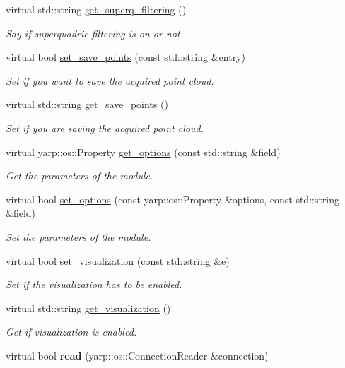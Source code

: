 \begin{DoxyCompactItemize}
virtual std\-::string \hyperlink{classsuperquadricModel__IDL_af99d29d42b96b8db6c90c5fd48cfb253}{get\-\_\-superq\-\_\-filtering} ()
\begin{DoxyCompactList}\small\item\em Say if superquadric filtering is on or not. \end{DoxyCompactList}\item 
virtual bool \hyperlink{classsuperquadricModel__IDL_a8368b783845a3e5ae7e0706ee5b888c0}{set\-\_\-save\-\_\-points} (const std\-::string \&entry)
\begin{DoxyCompactList}\small\item\em Set if you want to save the acquired point cloud. \end{DoxyCompactList}\item 
virtual std\-::string \hyperlink{classsuperquadricModel__IDL_a4b101fe118a1ee912468562bde0b0df4}{get\-\_\-save\-\_\-points} ()
\begin{DoxyCompactList}\small\item\em Set if you are saving the acquired point cloud. \end{DoxyCompactList}\item 
virtual yarp\-::os\-::\-Property \hyperlink{classsuperquadricModel__IDL_a50b388a29852f9d8b57a0bbb276d4675}{get\-\_\-options} (const std\-::string \&field)
\begin{DoxyCompactList}\small\item\em Get the parameters of the module. \end{DoxyCompactList}\item 
virtual bool \hyperlink{classsuperquadricModel__IDL_a575e0b591f07206b0d6c29e5cfeead37}{set\-\_\-options} (const yarp\-::os\-::\-Property \&options, const std\-::string \&field)
\begin{DoxyCompactList}\small\item\em Set the parameters of the module. \end{DoxyCompactList}\item 
virtual bool \hyperlink{classsuperquadricModel__IDL_a651c741e9b01b25d46be96b06b91011d}{set\-\_\-visualization} (const std\-::string \&e)
\begin{DoxyCompactList}\small\item\em Set if the visualization has to be enabled. \end{DoxyCompactList}\item 
virtual std\-::string \hyperlink{classsuperquadricModel__IDL_a5d9f4f0622ba19b60218636dc108ef61}{get\-\_\-visualization} ()
\begin{DoxyCompactList}\small\item\em Get if visualization is enabled. \end{DoxyCompactList}\item 
virtual bool {\bfseries read} (yarp\-::os\-::\-Connection\-Reader \&connection)\label{classsuperquadricModel__IDL_ac72a24dddca13978d7adcd5cf4f40b1f}


\end{DoxyCompactItemize}
